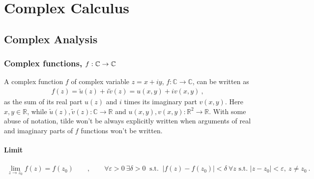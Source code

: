 \documentclass[letterpaper,10pt,english]{jupyterBook}
\begin{document}
\part{Complex Calculus}

\sphinxstepscope


\chapter{Complex Analysis}
\label{\detokenize{ch/complex/analysis:complex-analysis}}\label{\detokenize{ch/complex/analysis:id1}}\label{\detokenize{ch/complex/analysis::doc}}

\section{Complex functions, \protect\(f: \mathbb{C} \rightarrow \mathbb{C}\protect\)}
\label{\detokenize{ch/complex/analysis:complex-functions-f-mathbb-c-rightarrow-mathbb-c}}\label{\detokenize{ch/complex/analysis:complex-analysis-fun}}
\sphinxAtStartPar
A complex function \(f\) of complex variable \(z = x + i y\), \(f: \mathbb{C} \rightarrow \mathbb{C}\), can be written as
\begin{equation*}
\begin{split}f(z) = \tilde{u}(z) + i \tilde{v}(z) = u(x,y) + i v(x,y) \ ,\end{split}
\end{equation*}
\sphinxAtStartPar
as the sum of its real part \(u(z)\) and \(i\) times its imaginary part \(v(x,y)\). Here \(x,y \in \mathbb{R}\), while \(\tilde{u}(z), \tilde{v}(z): \mathbb{C} \rightarrow \mathbb{R}\) and \(u(x,y), v(x,y): \mathbb{R}^2 \rightarrow \mathbb{R}\). With some abuse of notation, tilde won’t be always explicitly written when arguments of real and imaginary parts of \(f\) functions won’t be written.


\subsection{Limit}
\label{\detokenize{ch/complex/analysis:limit}}\label{\detokenize{ch/complex/analysis:complex-analysis-fun-limit}}\begin{equation*}
\begin{split}\lim_{z \rightarrow z_0} f(z) = f(z_0) \qquad , \qquad \forall \varepsilon > 0 \ \exists \delta > 0 \ \text{ s.t. } \  |f(z) - f(z_0)| < \delta \ \forall z \text{ s.t. } |z - z_0| < \varepsilon, \ z \ne z_0 \ .\end{split}
\end{equation*}
\end{document}
